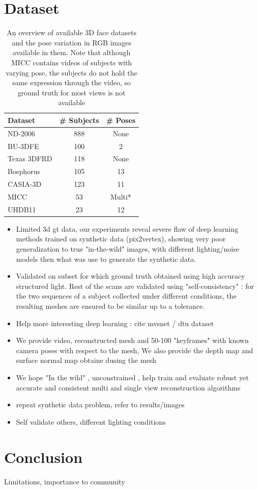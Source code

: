 \documentclass[10pt,twocolumn,letterpaper]{article}
\begin{document}
\section{Dataset}
\begin{table}
\begin{center}
\begin{tabular}{|l|c| c|}
\hline
Dataset & \# Subjects & \# Poses \\
\hline\hline
ND-2006 & 888 & None \\
BU-3DFE & 100 & 2 \\
Texas 3DFRD & 118 & None\\
Bosphorus & 105 & 13\\
CASIA-3D & 123 & 11\\
MICC & 53 & Multi*\\
UHDB11 & 23 & 12\\
\hline
\end{tabular}
\end{center}
\caption{An overview of available 3D face datasets and the pose variation in RGB images available in them. Note that although MICC contains videos of subjects with varying pose, the subjects do not hold the same expression through the video, so ground truth for most views is not available}
\end{table}


\begin{itemize}
    \item  Limited 3d gt data, our experiments reveal severe flaw of deep learning methods trained on synthetic data (pix2vertex), showing very poor generalization to true "in-the-wild" images, with different lighting/noise models then what was use to generate the synthetic data. 
    \item Validated on subset for which ground truth obtained using high accuracy structured light. Rest of the scans are validated using "self-consistency" : for the two sequences of a subject collected under different conditions, the resulting meshes are ensured to be similar up to a tolerance.
    \item Help more interesting deep learning : cite mvsnet / dtu dataset
    \item We provide video, reconstructed mesh and 50-100 "keyframes" with known camera poses with respect to the mesh, We also provide the depth map and surface normal map obtaine dusing the mesh
    \item We hope "In the wild" , unconstrained , help train and evaluate robust yet accurate and consistent multi and single view reconstruction algorithms

    \item repeat synthetic data problem, refer to results/images
    \item Self validate others, different lighting conditions

\end{itemize}

\section{Conclusion}
Limitations, importance to community

\newpage
\newpage
{\small


}
\end{document}
